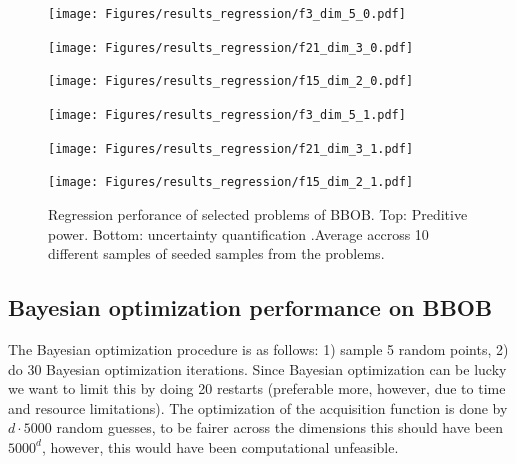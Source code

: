 \begin{figure}[H]
  \centering
  \begin{minipage}[b]{0.32\textwidth}
   \texttt{[image: Figures/results\_regression/f3\_dim\_5\_0.pdf]}
  \end{minipage}
  \hfill
  \begin{minipage}[b]{0.32\textwidth}
    \texttt{[image: Figures/results\_regression/f21\_dim\_3\_0.pdf]}
   \end{minipage}
   \hfill
   \begin{minipage}[b]{0.32\textwidth}
    \texttt{[image: Figures/results\_regression/f15\_dim\_2\_0.pdf]}
   \end{minipage}
   
     \begin{minipage}[b]{0.32\textwidth}
   \texttt{[image: Figures/results\_regression/f3\_dim\_5\_1.pdf]}
  \end{minipage}
  \hfill
  \begin{minipage}[b]{0.32\textwidth}
    \texttt{[image: Figures/results\_regression/f21\_dim\_3\_1.pdf]}
   \end{minipage}
   \hfill
   \begin{minipage}[b]{0.32\textwidth}
    \texttt{[image: Figures/results\_regression/f15\_dim\_2\_1.pdf]}
   \end{minipage}
   
  \caption{Regression perforance of selected problems of BBOB. Top: Preditive power. Bottom: uncertainty quantification 
  .Average accross 10 different samples of seeded samples from the problems.}
  \label{BBOB_regression}
\end{figure}


\subsection{Bayesian optimization performance on BBOB}
The Bayesian optimization procedure is as follows: 1) sample 5 random points, 2) do 30 Bayesian
optimization iterations. Since Bayesian optimization can be lucky we want to limit this by doing 20
restarts (preferable more, however, due to time and resource limitations). The optimization of the
acquisition function is done by $d \cdot 5000$ random guesses, to be fairer across the dimensions
this should have been $5000^d$, however, this would have been computational unfeasible. 



